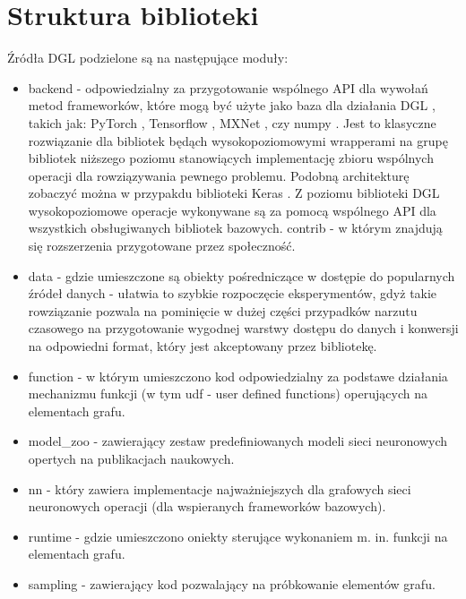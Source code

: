 \documentclass{article}
\begin{document}
\section{Struktura biblioteki}
\label{sec:dgl_structure}
Źródła DGL \cite{dgl_sources} podzielone są na następujące moduły:
\begin{itemize}
  \item backend - odpowiedzialny za przygotowanie wspólnego API dla wywołań metod frameworków, które mogą być użyte jako baza dla działania DGL \cite{dgl}, takich jak: PyTorch \cite{torch}, Tensorflow \cite{tf}, MXNet \cite{mxnet}, czy numpy \cite{np}. Jest to klasyczne rozwiązanie dla bibliotek będąch wysokopoziomowymi wrapperami na grupę bibliotek niższego poziomu stanowiących implementację zbioru wspólnych operacji dla rowziązywania pewnego problemu. Podobną architekturę zobaczyć można w przypakdu biblioteki Keras \cite{keras}. Z poziomu biblioteki DGL \cite{dgl} wysokopoziomowe operacje wykonywane są za pomocą wspólnego API dla wszystkich obsługiwanych bibliotek bazowych.   
  \tem contrib - w którym znajdują się rozszerzenia przygotowane przez społeczność.
  \item data - gdzie umieszczone są obiekty pośredniczące w dostępie do popularnych źródeł danych - ułatwia to szybkie rozpoczęcie eksperymentów, gdyż takie rowziązanie pozwala na pominięcie w dużej części przypadków narzutu czasowego na przygotowanie wygodnej warstwy dostępu do danych i konwersji na odpowiedni format, który jest akceptowany przez bibliotekę.
  \item function - w którym umieszczono kod odpowiedzialny za podstawe działania mechanizmu funkcji (w tym udf - user defined functions) operujących na elementach grafu.
  \item model\_zoo - zawierający zestaw predefiniowanych modeli sieci neuronowych opertych na publikacjach naukowych.
  \item nn - który zawiera implementacje najważniejszych dla grafowych sieci neuronowych operacji (dla wspieranych frameworków bazowych).
  \item runtime - gdzie umieszczono oniekty sterujące wykonaniem m. in. funkcji na elementach grafu.
  \item sampling - zawierający kod pozwalający na próbkowanie elementów grafu.
\end{itemize}
  
 \paragraph{}
\end{document}
